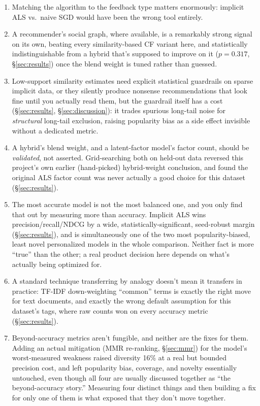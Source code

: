 \documentclass[11pt,a4paper]{article}
\newcommand{\secref}[1]{\S\ref{#1}}
\begin{document}
\begin{enumerate}[leftmargin=*]
  \item Matching the algorithm to the feedback type matters enormously: implicit ALS vs.\ naive SGD would have been the wrong tool entirely.
  \item A recommender's social graph, where available, is a remarkably strong signal on its own, beating every similarity-based CF variant here, and statistically indistinguishable from a hybrid that's supposed to improve on it ($p=0.317$, \secref{sec:results}) once the blend weight is tuned rather than guessed.
  \item Low-support similarity estimates need explicit statistical guardrails on sparse implicit data, or they silently produce nonsense recommendations that look fine until you actually read them, but the guardrail itself has a cost (\secref{sec:results}, \secref{sec:discussion}): it trades spurious long-tail noise for \emph{structural} long-tail exclusion, raising popularity bias as a side effect invisible without a dedicated metric.
  \item A hybrid's blend weight, and a latent-factor model's factor count, should be \emph{validated}, not asserted. Grid-searching both on held-out data reversed this project's own earlier (hand-picked) hybrid-weight conclusion, and found the original ALS factor count was never actually a good choice for this dataset (\secref{sec:results}).
  \item The most accurate model is not the most balanced one, and you only find that out by measuring more than accuracy. Implicit ALS wins precision/recall/NDCG by a wide, statistically-significant, seed-robust margin (\secref{sec:results}), and is simultaneously one of the two most popularity-biased, least novel personalized models in the whole comparison. Neither fact is more ``true'' than the other; a real product decision here depends on what's actually being optimized for.
  \item A standard technique transferring by analogy doesn't mean it transfers in practice: TF-IDF down-weighting ``common'' terms is exactly the right move for text documents, and exactly the wrong default assumption for this dataset's tags, where raw counts won on every accuracy metric (\secref{sec:results}).
  \item Beyond-accuracy metrics aren't fungible, and neither are the fixes for them. Adding an actual mitigation (MMR re-ranking, \secref{sec:mmr}) for the model's worst-measured weakness raised diversity 16\% at a real but bounded precision cost, and left popularity bias, coverage, and novelty essentially untouched, even though all four are usually discussed together as ``the beyond-accuracy story.'' Measuring four distinct things and then building a fix for only one of them is what exposed that they don't move together.

\end{enumerate}
\end{document}

